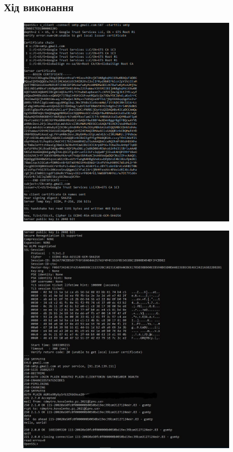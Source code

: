 \documentclass{article}
\begin{document}
\begin{normalsize}
\section*{Хід виконання}
\begin{figure}[H]
	\centering
	\includegraphics[width=\textwidth]{11}
\end{figure}
\begin{figure}[H]
	\centering
	\includegraphics[width=\textwidth]{12}

\end{figure}
\end{normalsize}
\end{document}
